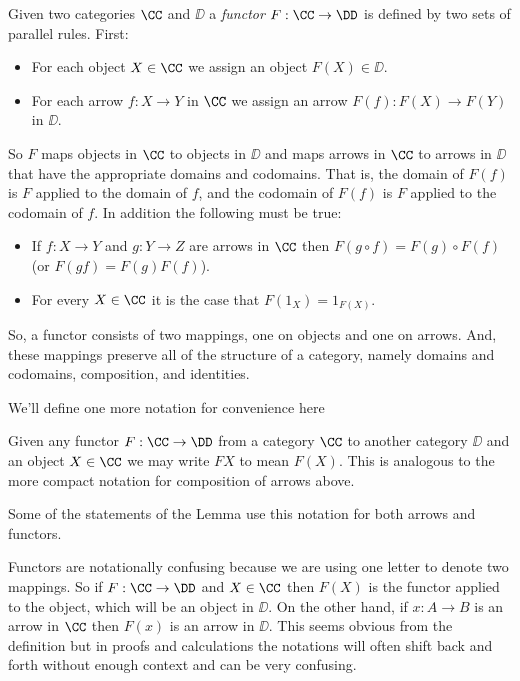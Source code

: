 \documentclass[12pt]{article}
\begin{document}
\begin{defn}
Given two categories $\CC$ and $\DD$ a {\it functor} $F : \CC \to \DD$ is defined by two sets of parallel rules. First:
\begin{itemize}
\item For each object $X \in \CC$ we assign an object $F(X) \in \DD$.
\item For each arrow $f: X \to Y$ in $\CC$ we assign an arrow $F(f): F(X) \to F(Y)$ in $\DD$.
\end{itemize}
\noindent
So $F$ maps objects in $\CC$ to objects in $\DD$ and maps arrows in $\CC$ to arrows in $\DD$ that have the appropriate domains and codomains. That is, the domain of $F(f)$ is $F$ applied to the domain of $f$, and the codomain of $F(f)$ is $F$ applied to the codomain of $f$. In addition the following must be true:
\begin{itemize}
\item If $f:X \to Y$ and $g: Y \to Z$ are arrows in $\CC$ then $F(g \circ f) = F(g) \circ F(f)$ (or $F(gf) = F(g)F(f)$).
\item For every $X \in \CC$ it is the case that $F(1_X) = 1_{F(X)}$.
\end{itemize}

\end{defn}
\noindent
So, a functor consists of two mappings, one on objects and one on arrows. And, these mappings preserve all of the structure of a category, 
namely domains and codomains, composition, and identities.

We'll define one more notation for convenience here

\begin{defn}
Given any functor $F: \CC \to \DD$ from a category $\CC$ to another category $\DD$ and an object $X \in \CC$ we may write $F X$ to mean $F(X)$. This is analogous to the more compact notation for composition of arrows above.
\end{defn}
\noindent
Some of the statements of the Lemma use this notation for both arrows and functors.

Functors are notationally confusing because we are using one letter to denote two mappings. So if $F: \CC \to \DD$ and $X \in \CC$ then $F(X)$ is the functor applied to the object, which will be an object in $\DD$. On the other hand, if $x : A \to B$ is an arrow in $\CC$ then $F(x)$ is an arrow in $\DD$. This seems obvious from the definition but in proofs and calculations the notations will often shift back and forth without enough context and can be very confusing.
\end{document}
